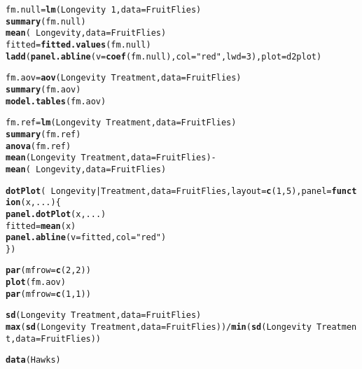 \documentclass[10pt]{article}\usepackage[]{graphicx}\usepackage[]{color}
\makeatletter
\newcommand{\hlnum}[1]{\textcolor[rgb]{0.686,0.059,0.569}{#1}}%
\newcommand{\hlstr}[1]{\textcolor[rgb]{0.192,0.494,0.8}{#1}}%
\newcommand{\hlopt}[1]{\textcolor[rgb]{0,0,0}{#1}}%
\newcommand{\hlstd}[1]{\textcolor[rgb]{0.345,0.345,0.345}{#1}}%
\newcommand{\hlkwa}[1]{\textcolor[rgb]{0.161,0.373,0.58}{\textbf{#1}}}%
\newcommand{\hlkwb}[1]{\textcolor[rgb]{0.69,0.353,0.396}{#1}}%
\newcommand{\hlkwc}[1]{\textcolor[rgb]{0.333,0.667,0.333}{#1}}%
\newcommand{\hlkwd}[1]{\textcolor[rgb]{0.737,0.353,0.396}{\textbf{#1}}}%
\newenvironment{kframe}{%
 \def\at@end@of@kframe{}%
 \ifinner\ifhmode%
  \def\at@end@of@kframe{\end{minipage}}%
  \begin{minipage}{\columnwidth}%
 \fi\fi%
 \def\FrameCommand##1{\hskip\@totalleftmargin \hskip-\fboxsep
 \colorbox{shadecolor}{##1}\hskip-\fboxsep
     \hskip-\linewidth \hskip-\@totalleftmargin \hskip\columnwidth}%
 \MakeFramed {\advance\hsize-\width
   \@totalleftmargin\z@ \linewidth\hsize
   \@setminipage}}%
 {\par\unskip\endMakeFramed%
 \at@end@of@kframe}
\newenvironment{knitrout}{}{} %
\makeatother
\begin{document}
\begin{knitrout}
\begin{kframe}
\begin{alltt}
\hlstd{fm.null} \hlkwb{=} \hlkwd{lm}\hlstd{(Longevity} \hlopt{~} \hlnum{1}\hlstd{,} \hlkwc{data}\hlstd{=FruitFlies)}
\hlkwd{summary}\hlstd{(fm.null)}
\hlkwd{mean}\hlstd{(}\hlopt{~}\hlstd{Longevity,} \hlkwc{data}\hlstd{=FruitFlies)}
\hlstd{fitted} \hlkwb{=} \hlkwd{fitted.values}\hlstd{(fm.null)}
\hlkwd{ladd}\hlstd{(}\hlkwd{panel.abline}\hlstd{(}\hlkwc{v}\hlstd{=}\hlkwd{coef}\hlstd{(fm.null),} \hlkwc{col}\hlstd{=}\hlstr{"red"}\hlstd{,} \hlkwc{lwd}\hlstd{=}\hlnum{3}\hlstd{),} \hlkwc{plot}\hlstd{=d2plot)}

\hlstd{fm.aov} \hlkwb{=} \hlkwd{aov}\hlstd{(Longevity} \hlopt{~} \hlstd{Treatment,} \hlkwc{data}\hlstd{=FruitFlies)}
\hlkwd{summary}\hlstd{(fm.aov)}
\hlkwd{model.tables}\hlstd{(fm.aov)}

\hlstd{fm.ref} \hlkwb{=} \hlkwd{lm}\hlstd{(Longevity} \hlopt{~} \hlstd{Treatment,} \hlkwc{data}\hlstd{=FruitFlies)}
\hlkwd{summary}\hlstd{(fm.ref)}
\hlkwd{anova}\hlstd{(fm.ref)}
\hlkwd{mean}\hlstd{(Longevity}\hlopt{~}\hlstd{Treatment,} \hlkwc{data} \hlstd{= FruitFlies)} \hlopt{-} \hlkwd{mean}\hlstd{(}\hlopt{~}\hlstd{Longevity,} \hlkwc{data} \hlstd{= FruitFlies)}

\hlkwd{dotPlot}\hlstd{(}\hlopt{~}\hlstd{Longevity} \hlopt{|} \hlstd{Treatment,} \hlkwc{data}\hlstd{=FruitFlies,} \hlkwc{layout}\hlstd{=}\hlkwd{c}\hlstd{(}\hlnum{1}\hlstd{,}\hlnum{5}\hlstd{),} \hlkwc{panel}\hlstd{=}\hlkwa{function}\hlstd{(}\hlkwc{x}\hlstd{,}\hlkwc{...}\hlstd{)\{}
  \hlkwd{panel.dotPlot}\hlstd{(x, ...)}
  \hlstd{fitted} \hlkwb{=} \hlkwd{mean}\hlstd{(x)}
  \hlkwd{panel.abline}\hlstd{(}\hlkwc{v}\hlstd{=fitted,} \hlkwc{col}\hlstd{=}\hlstr{"red"}\hlstd{)}
\hlstd{\})}

\hlkwd{par}\hlstd{(}\hlkwc{mfrow}\hlstd{=}\hlkwd{c}\hlstd{(}\hlnum{2}\hlstd{,}\hlnum{2}\hlstd{))}
\hlkwd{plot}\hlstd{(fm.aov)}
\hlkwd{par}\hlstd{(}\hlkwc{mfrow}\hlstd{=}\hlkwd{c}\hlstd{(}\hlnum{1}\hlstd{,}\hlnum{1}\hlstd{))}

\hlkwd{sd}\hlstd{(Longevity}\hlopt{~}\hlstd{Treatment,} \hlkwc{data}\hlstd{=FruitFlies)}
\hlkwd{max}\hlstd{(}\hlkwd{sd}\hlstd{(Longevity}\hlopt{~}\hlstd{Treatment,} \hlkwc{data}\hlstd{=FruitFlies))} \hlopt{/} \hlkwd{min}\hlstd{(}\hlkwd{sd}\hlstd{(Longevity}\hlopt{~}\hlstd{Treatment,} \hlkwc{data}\hlstd{=FruitFlies))}

\hlkwd{data}\hlstd{(Hawks)}
\end{alltt}
\end{kframe}
\end{knitrout}

\end{document}
